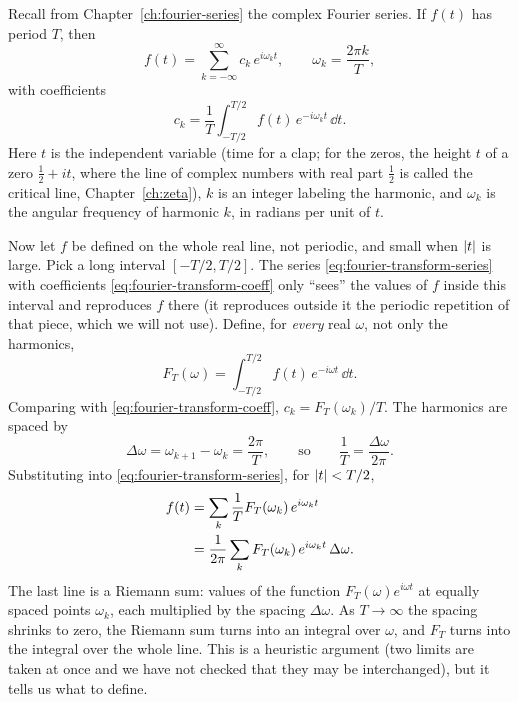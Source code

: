 Recall from Chapter~\ref{ch:fourier-series} the complex Fourier series. If $f(t)$ has period $T$, then
\begin{equation}
f(t)=\sum_{k=-\infty}^{\infty}c_k\,e^{i\omega_k t},\qquad \omega_k=\frac{2\pi k}{T},
\label{eq:fourier-transform-series}
\end{equation}
with coefficients
\begin{equation}
c_k=\frac1T\int_{-T/2}^{T/2}f(t)\,e^{-i\omega_k t}\,\dd t .
\label{eq:fourier-transform-coeff}
\end{equation}
Here $t$ is the independent variable (time for a clap; for the zeros, the height $t$ of a zero $\tfrac12+it$, where the line of complex numbers with real part $\tfrac12$ is called the critical line, Chapter~\ref{ch:zeta}), $k$ is an integer labeling the harmonic, and $\omega_k$ is the angular frequency of harmonic $k$, in radians per unit of $t$.

Now let $f$ be defined on the whole real line, not periodic, and small when $\left\lvert t\right\rvert$ is large. Pick a long interval $[-T/2,T/2]$. The series \eqref{eq:fourier-transform-series} with coefficients \eqref{eq:fourier-transform-coeff} only ``sees'' the values of $f$ inside this interval and reproduces $f$ there (it reproduces outside it the periodic repetition of that piece, which we will not use). Define, for \emph{every} real $\omega$, not only the harmonics,
\begin{equation}
F_T(\omega)=\int_{-T/2}^{T/2}f(t)\,e^{-i\omega t}\,\dd t .
\label{eq:fourier-transform-FT}
\end{equation}
Comparing with \eqref{eq:fourier-transform-coeff}, $c_k=F_T(\omega_k)/T$. The harmonics are spaced by
\begin{equation}
\Delta\omega=\omega_{k+1}-\omega_k=\frac{2\pi}{T},\qquad\text{so}\qquad \frac1T=\frac{\Delta\omega}{2\pi}.
\end{equation}
Substituting into \eqref{eq:fourier-transform-series}, for $\left\lvert t\right\rvert<T/2$,
\begin{align}
f(t)&=\sum_{k}\frac{1}{T}F_T(\omega_k)\,e^{i\omega_k t}\notag\\
&=\frac{1}{2\pi}\sum_{k}F_T(\omega_k)\,e^{i\omega_k t}\,\Delta\omega .
\label{eq:fourier-transform-riemann}
\end{align}
The last line is a Riemann sum: values of the function $F_T(\omega)e^{i\omega t}$ at equally spaced points $\omega_k$, each multiplied by the spacing $\Delta\omega$. As $T\to\infty$ the spacing shrinks to zero, the Riemann sum turns into an integral over $\omega$, and $F_T$ turns into the integral over the whole line. This is a heuristic argument (two limits are taken at once and we have not checked that they may be interchanged), but it tells us what to define.

